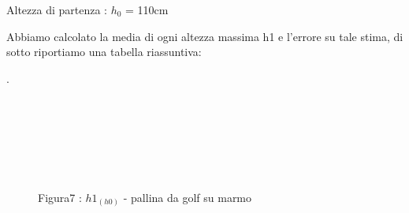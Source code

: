 \documentclass[a4paper]{article}
\theoremstyle{definition}
\begin{document}
\noindent Altezza di partenza : \(h_{0}\) = 110cm	
	\begin{table}[!ht]
		\centering
		
	\end{table}
	
	\noindent Abbiamo calcolato la media di ogni altezza massima h1 e l'errore su tale stima, di sotto riportiamo una tabella riassuntiva:
	
	\begin{figure}[!htbp]
	\end{figure}
.\\\\\\\\\\\\\\
	\begin{figure}[!ht]
		\captionsetup{labelformat=empty}
		\caption{Figura7 : \(h1_{(h0)}\) - pallina da golf su marmo}
	\end{figure}
	
\end{document}
